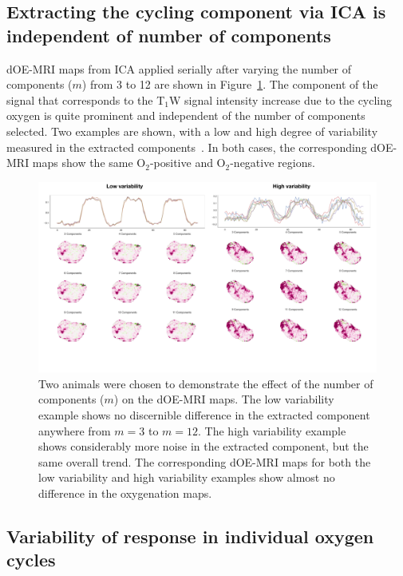 \subsection{Extracting the cycling component via \ac{ICA} is independent of number of components}
\label{sec:numComponents}
dOE-MRI maps from \ac{ICA} applied serially after varying the number of components ($m$) from 3 to 12 are shown in Figure~\ref{numComponents}.
The component of the signal that corresponds to the T$_1$W signal intensity increase due to the cycling oxygen is quite prominent and independent of the number of components selected.
Two examples are shown, with a low and high degree of variability measured in the extracted components~.
In both cases, the corresponding \ac{dOE-MRI} maps show the same O$_2$-positive and O$_2$-negative regions.

\begin{figure}[htbp]
   \centering
   \includegraphics[width=\textwidth]{oemri_thesis1/oemri_thesis1-images/technical_numComponents.pdf} %
   \caption{Two animals were chosen to demonstrate the effect of the number of components ($m$) on the \ac{dOE-MRI} maps. The low variability example shows no discernible difference in the extracted component anywhere from $m=3$ to $m=12$. The high variability example shows considerably more noise in the extracted component, but the same overall trend. The corresponding \ac{dOE-MRI} maps for both the low variability and high variability examples show almost no difference in the oxygenation maps.}
   \label{numComponents}
\end{figure}

\subsection{Variability of response in individual oxygen cycles}


